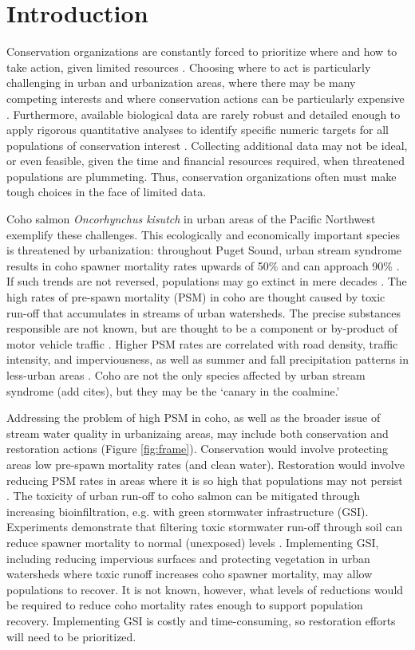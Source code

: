 \documentclass{article}
\begin{document}
\section*{Introduction}
\par Conservation organizations are constantly forced to prioritize where and how to take action, given limited resources \citep{game2013}. Choosing where to act is particularly challenging in urban and urbanization areas, where there may be many competing interests and where conservation actions can be particularly expensive \citep{moilanen2011}. Furthermore, available biological data are rarely robust and detailed enough to apply rigorous quantitative analyses to identify specific numeric targets for all populations of conservation interest \citep{carwardine2009}. Collecting additional data may not be ideal, or even feasible, given the time and financial resources required, when threatened populations are plummeting. Thus, conservation organizations often must make tough choices in the face of limited data.
\par Coho salmon \emph{Oncorhynchus kisutch} in urban areas of the Pacific Northwest exemplify these challenges. This ecologically and economically important species is threatened by urbanization: throughout Puget Sound, urban stream syndrome results in coho spawner mortality rates upwards of 50\% and can approach 90\% \citep{feist2017,spromberg2011}. If such trends are not reversed, populations may go extinct in mere decades \citep{spromberg2011}. 
The high rates of pre-spawn mortality (PSM) in coho are thought caused by toxic run-off that accumulates in streams of urban watersheds. The precise substances responsible  are not known, but are thought to be a component or by-product of motor vehicle traffic \citep{spromberg2016}. Higher PSM rates are correlated with road density, traffic intensity, and imperviousness, as well as summer and fall precipitation patterns in less-urban areas \citep{feist2017}. Coho are not the only species affected by urban stream syndrome (add cites), but they may be the `canary in the coalmine.'
\par Addressing the problem of high PSM in coho, as well as the broader issue of stream water quality in urbanizaing areas, may include both conservation and restoration actions (Figure \ref{fig:frame}). Conservation would involve protecting areas low pre-spawn mortality rates (and clean water). Restoration would involve reducing PSM rates in areas where it is so high that populations may not persist \citep{spromberg2011}. The toxicity of urban run-off to coho salmon can be mitigated through increasing bioinfiltration, e.g. with green stormwater infrastructure (GSI). Experiments demonstrate that filtering toxic stormwater run-off through soil can reduce spawner mortality to normal (unexposed) levels \cite{spromberg2016}. Implementing GSI, including reducing impervious surfaces and protecting vegetation in urban watersheds where toxic runoff increases coho spawner mortality, may allow populations to recover. It is not known, however, what levels of reductions would be required to reduce coho mortality rates enough to support population recovery. Implementing GSI is costly and time-consuming, so restoration efforts will need to be prioritized. 
\end{document}

